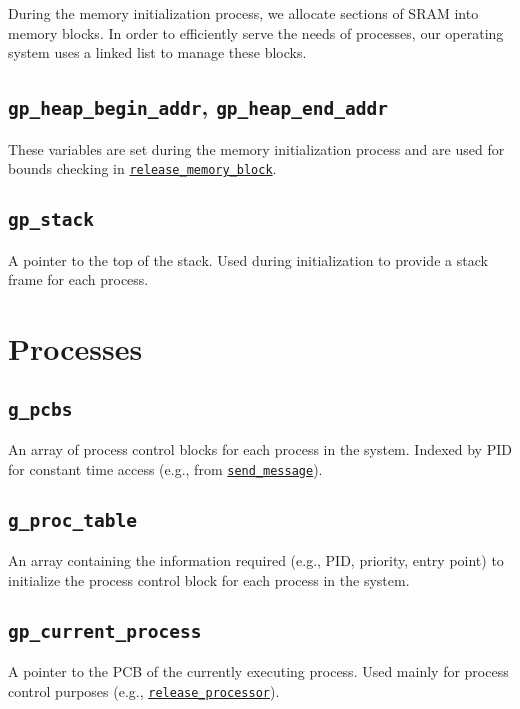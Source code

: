 \documentclass[12pt]{report}
\begin{document}
During the memory initialization process, we allocate sections of SRAM into memory blocks. In order to efficiently serve the needs of processes, our operating system uses a linked list to manage these blocks.

\subsection{\texttt{gp_heap_begin_addr}, \texttt{gp_heap_end_addr}}

These variables are set during the memory initialization process and are used for bounds checking in \hyperref[alg:releasingmemoryblocks]{\texttt{release_memory_block}}.

\subsection{\texttt{gp_stack}}

A pointer to the top of the stack. Used during initialization to provide a stack frame for each process.

\section{Processes}

\subsection{\texttt{g_pcbs}}

An array of process control blocks for each process in the system. Indexed by PID for constant time access (e.g., from \hyperref[alg:sendingmessages]{\texttt{send_message}}).

\subsection{\texttt{g_proc_table}}

An array containing the information required (e.g., PID, priority, entry point) to initialize the process control block for each process in the system.

\subsection{\texttt{gp_current_process}}

A pointer to the PCB of the currently executing process. Used mainly for process control purposes (e.g., \hyperref[alg:releasingtheprocessor]{\texttt{release_processor}}).
\end{document}
